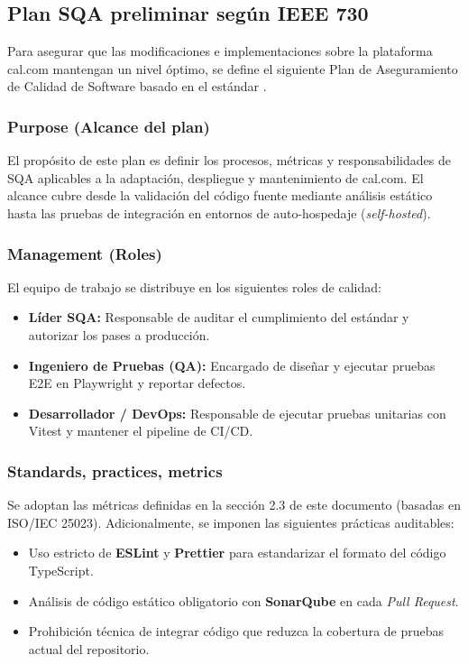 \documentclass[12pt, a4paper]{article}
\begin{document}
\subsection{Plan SQA preliminar según IEEE 730}

Para asegurar que las modificaciones e implementaciones sobre la plataforma cal.com mantengan un nivel óptimo, se define el siguiente Plan de Aseguramiento de Calidad de Software basado en el estándar \parencite{ieee730}.

\subsubsection*{Purpose (Alcance del plan)}
El propósito de este plan es definir los procesos, métricas y responsabilidades de SQA aplicables a la adaptación, despliegue y mantenimiento de cal.com. El alcance cubre desde la validación del código fuente mediante análisis estático hasta las pruebas de integración en entornos de auto-hospedaje (\textit{self-hosted}).

\subsubsection*{Management (Roles)}
El equipo de trabajo se distribuye en los siguientes roles de calidad:
\begin{itemize}
    \item \textbf{Líder SQA:} Responsable de auditar el cumplimiento del estándar y autorizar los pases a producción.
    \item \textbf{Ingeniero de Pruebas (QA):} Encargado de diseñar y ejecutar pruebas E2E en Playwright y reportar defectos.
    \item \textbf{Desarrollador / DevOps:} Responsable de ejecutar pruebas unitarias con Vitest y mantener el pipeline de CI/CD.
\end{itemize}

\subsubsection*{Standards, practices, metrics}
Se adoptan las métricas definidas en la sección 2.3 de este documento (basadas en ISO/IEC 25023). Adicionalmente, se imponen las siguientes prácticas auditables:
\begin{itemize}
    \item Uso estricto de \textbf{ESLint} y \textbf{Prettier} para estandarizar el formato del código TypeScript.
    \item Análisis de código estático obligatorio con \textbf{SonarQube} en cada \textit{Pull Request}.
    \item Prohibición técnica de integrar código que reduzca la cobertura de pruebas actual del repositorio.
\end{itemize}
\end{document}
